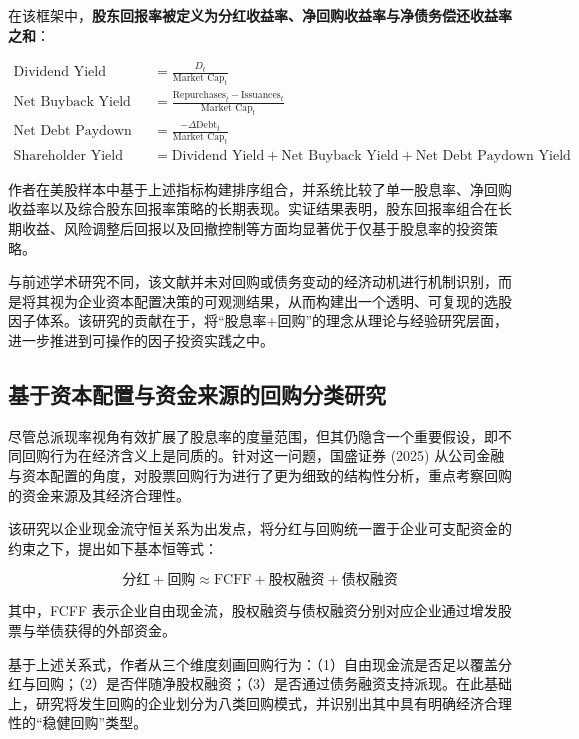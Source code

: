 \documentclass[a4paper,10pt]{article}
\begin{document}
在该框架中，\textbf{股东回报率被定义为分红收益率、净回购收益率与净债务偿还收益率之和}：

\begin{equation}
\begin{aligned}
    \text{Dividend Yield} &= \frac{D_t}{\text{Market Cap}_t} \\
    \text{Net Buyback Yield} &= \frac{\text{Repurchases}_t - \text{Issuances}_t}{\text{Market Cap}_t} \\
    \text{Net Debt Paydown Yield} &= \frac{-\Delta \text{Debt}_t}{\text{Market Cap}_t} \\
    \text{Shareholder Yield} &= \text{Dividend Yield} + \text{Net Buyback Yield} + \text{Net Debt Paydown Yield}
\end{aligned}
\end{equation}

作者在美股样本中基于上述指标构建排序组合，并系统比较了单一股息率、净回购收益率以及综合股东回报率策略的长期表现。实证结果表明，股东回报率组合在长期收益、风险调整后回报以及回撤控制等方面均显著优于仅基于股息率的投资策略。

与前述学术研究不同，该文献并未对回购或债务变动的经济动机进行机制识别，而是将其视为企业资本配置决策的可观测结果，从而构建出一个透明、可复现的选股因子体系。该研究的贡献在于，将“股息率+回购”的理念从理论与经验研究层面，进一步推进到可操作的因子投资实践之中。

\subsection{基于资本配置与资金来源的回购分类研究}

尽管总派现率视角有效扩展了股息率的度量范围，但其仍隐含一个重要假设，即不同回购行为在经济含义上是同质的。针对这一问题，国盛证券 (2025) 从公司金融与资本配置的角度，对股票回购行为进行了更为细致的结构性分析，重点考察回购的资金来源及其经济合理性。

该研究以企业现金流守恒关系为出发点，将分红与回购统一置于企业可支配资金的约束之下，提出如下基本恒等式：

\begin{equation}
    \text{分红} + \text{回购} \approx \text{FCFF} + \text{股权融资} + \text{债权融资}
\end{equation}

其中，FCFF 表示企业自由现金流，股权融资与债权融资分别对应企业通过增发股票与举债获得的外部资金。

基于上述关系式，作者从三个维度刻画回购行为：（1）自由现金流是否足以覆盖分红与回购；（2）是否伴随净股权融资；（3）是否通过债务融资支持派现。在此基础上，研究将发生回购的企业划分为八类回购模式，并识别出其中具有明确经济合理性的“稳健回购”类型。
\end{document}
